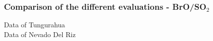 \documentclass[aspectratio=169]{beamer} %
\begin{document}
		\begin{frame}
			\frametitle{\color{mygreen}Comparison of the different evaluations - BrO/SO$_2$\\%
				\color{mygreen}{\rule{0.8\textwidth}{2pt}}}
			\begin{figure}[h!]	
			\end{figure}
		\vspace{-0.7cm}
			\begin{multicols}{2}
				\centering
				Data of Tungurahua\\
				Data of Nevado Del Riz
			\end{multicols}
		\end{frame}
	
\end{document}

